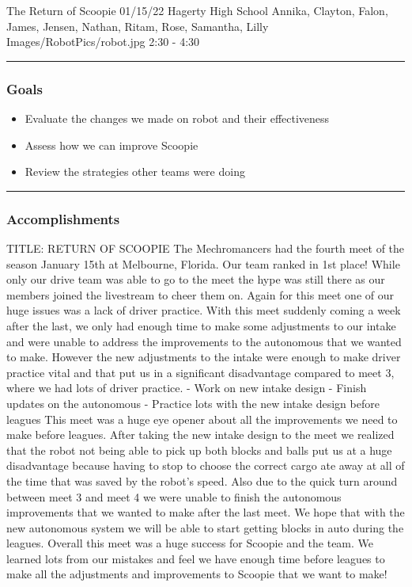\insertmeeting 
	{The Return of Scoopie} 
	{01/15/22} 
	{Hagerty High School}
	{Annika, Clayton, Falon, James, Jensen, Nathan, Ritam, Rose, Samantha, Lilly}
	{Images/RobotPics/robot.jpg}
	{2:30 - 4:30}
	
\noindent\hfil\rule{\textwidth}{.4pt}\hfil
\subsubsection*{Goals}
\begin{itemize}
    \item Evaluate the changes we made on robot and their effectiveness
    \item Assess how we can improve Scoopie
    \item Review the strategies other teams were doing
  

\end{itemize} 

\noindent\hfil\rule{\textwidth}{.4pt}\hfil

\subsubsection*{Accomplishments}
TITLE: RETURN OF SCOOPIE
The Mechromancers had the fourth meet of the season January 15th at Melbourne, Florida. Our team ranked in 1st place! While only our drive team was able to go to the meet the hype was still there as our members joined the livestream to cheer them on. Again for this meet one of our huge issues was a lack of driver practice.  With this meet  suddenly coming a week after the last, we only had enough time to make some adjustments to our intake and were unable to address the improvements to the autonomous that we wanted to make. However the new adjustments to the intake were enough to make driver practice vital and that put us in a significant disadvantage compared to meet 3, where we had lots of driver practice.
- Work on new intake design
- Finish updates on the autonomous 
- Practice lots with the new intake design before leagues
This meet was a huge eye opener about all the improvements we need to make before leagues. After taking the new intake design to the meet we realized that the robot not being able to pick up both blocks and balls put us at a huge disadvantage because having to stop to choose the correct cargo ate away at all of the time that was saved by the robot's speed. Also due to the quick turn around between meet 3 and meet 4 we were unable to finish the autonomous improvements that we wanted to make after the last meet. We hope that with the new autonomous system we will be able to start getting blocks in auto during the leagues. Overall this meet was a huge success for Scoopie and the team. We learned lots from our mistakes and feel we have enough time before leagues to make all the adjustments and improvements to Scoopie that we want to make! 

